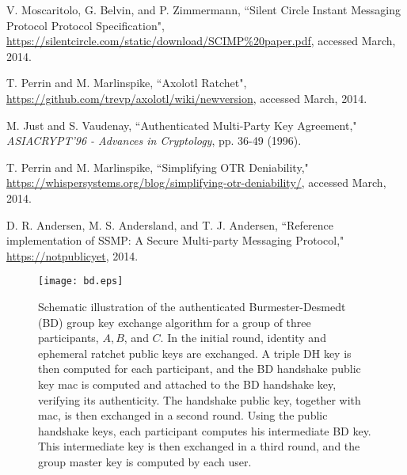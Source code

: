 \documentclass[%
preprint,
amsmath,amssymb,
aps,
prb,
floatfix,
]{revtex4-1}
\begin{document}
\begin{thebibliography}{99}
  V. Moscaritolo, G. Belvin, and P. Zimmermann,
``Silent Circle Instant Messaging Protocol Protocol Specification",
\url{https://silentcircle.com/static/download/SCIMP%20paper.pdf}, accessed 
March, 2014.

 T. Perrin and M. Marlinspike, ``Axolotl Ratchet",
\url{https://github.com/trevp/axolotl/wiki/newversion}, accessed March, 2014.

 M. Just and S. Vaudenay, ``Authenticated Multi-Party
Key Agreement," \textit{ASIACRYPT'96 - Advances in Cryptology}, pp. 36-49
(1996).

 T. Perrin and M. Marlinspike, ``Simplifying OTR
Deniability,"
\url{https://whispersystems.org/blog/simplifying-otr-deniability/}, accessed
March, 2014.

 D. R. Andersen, M. S. Andersland, and T.
J. Andersen, ``Reference implementation of SSMP: A Secure Multi-party Messaging
Protocol," \url{https://notpublicyet}, 2014.

\end{thebibliography}

\newpage
\begin{figure}[htb]
\centerline{\texttt{[image: bd.eps]}}
\caption{
Schematic illustration of the authenticated Burmester-Desmedt (BD) group key exchange
algorithm for a group of three participants, $A, B$, and $C$.
In the initial round, identity and ephemeral ratchet public keys are exchanged.
A triple DH key is then computed for each participant, and the BD handshake
public key mac is computed and attached to the BD handshake key, verifying its
authenticity.  The handshake public key, together with mac, is then exchanged in
a second round.
Using the public handshake keys, each participant computes his intermediate BD
key. This intermediate key is then exchanged in a third round, and the group
master key is computed by each user.}
\label{fig:bd}
\end{figure}
\end{document}

